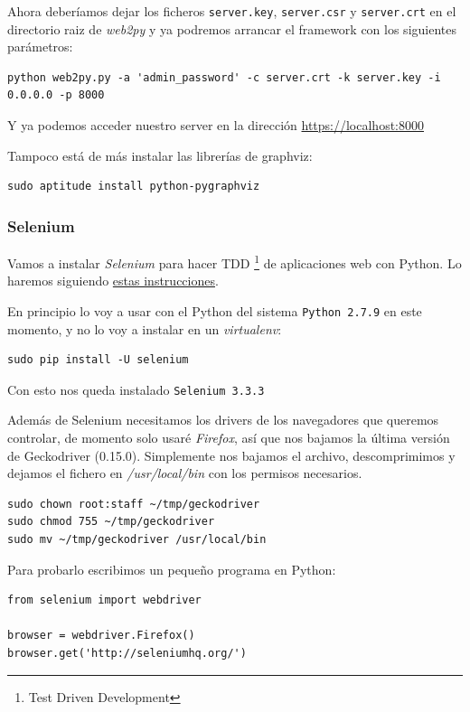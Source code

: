 \documentclass[12pt,spanish,]{scrartcl}
\begin{document}
Ahora deberíamos dejar los ficheros \texttt{server.key},
\texttt{server.csr} y \texttt{server.crt} en el directorio raiz de
\emph{web2py} y ya podremos arrancar el framework con los siguientes
parámetros:

\begin{verbatim}
python web2py.py -a 'admin_password' -c server.crt -k server.key -i 0.0.0.0 -p 8000
\end{verbatim}

Y ya podemos acceder nuestro server en la dirección
\url{https://localhost:8000}

Tampoco está de más instalar las librerías de graphviz:

\begin{verbatim}
sudo aptitude install python-pygraphviz
\end{verbatim}

\subsubsection{Selenium}\label{selenium}

Vamos a instalar \emph{Selenium} para hacer TDD \footnote{Test Driven
  Development} de aplicaciones web con Python. Lo haremos siguiendo
\href{http://selenium-python.readthedocs.io/index.html}{estas
instrucciones}.

En principio lo voy a usar con el Python del sistema
\texttt{Python\ 2.7.9} en este momento, y no lo voy a instalar en un
\emph{virtualenv}:

\begin{verbatim}
sudo pip install -U selenium
\end{verbatim}

Con esto nos queda instalado \texttt{Selenium\ 3.3.3}

Además de Selenium necesitamos los drivers de los navegadores que
queremos controlar, de momento solo usaré \emph{Firefox}, así que nos
bajamos la última versión de Geckodriver (0.15.0). Simplemente nos
bajamos el archivo, descomprimimos y dejamos el fichero en
\emph{/usr/local/bin} con los permisos necesarios.

\begin{verbatim}
sudo chown root:staff ~/tmp/geckodriver
sudo chmod 755 ~/tmp/geckodriver
sudo mv ~/tmp/geckodriver /usr/local/bin
\end{verbatim}

Para probarlo escribimos un pequeño programa en Python:

\begin{verbatim}
from selenium import webdriver

browser = webdriver.Firefox()
browser.get('http://seleniumhq.org/')
\end{verbatim}
\end{document}
